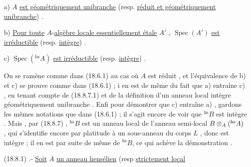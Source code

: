 a) $A$ \uline{est géométriquement unibranche} (resp. \uline{réduit et géométriquement unibranche}) .

b) \uline{Pour toute} $A$-\uline{algèbre locale essentiellement étale} $A'$ , $\operatorname{Spec}(A')$ \uline{est irréductible} (resp. \uline{intègre}) .

c) $\operatorname{Spec}({}^{\mathrm{hs}}A)$ \uline{est irréductible} (resp. \uline{intègre}) .

On se ramène comme dans (18.6.1) au cas où $A$ est réduit \handwritten{[}, \handwritten{]} et l'équivalence de b) et c) se prouve comme dans (18.6.1) ; i en est de même du fait que a) entraîne c) , en tenant compte de (18.8.7.1) et de la définition d'un anneau local intègre géométriquement unibranche . Enfi pour démontrer que c) entraîne a) , gardons les mêmes notations que dans (18.6.1) ; il s'agit encore de voir que $ {}^{\mathrm{hs}}B$ est intègre . Mais , par (18.8.7) , $ {}^{\mathrm{hs}}B$ est un anneau local de l'anneau semi-local $B\otimes_A({}^{\mathrm{hs}}A)$ , qui s'identifie encore par platitude à un sous-anneau du corps $L$ , donc est intègre ; il en est par suite de même de $ {}^{\mathrm{hs}}B$, \handwritten{\unsure{/}}ce qui achève la démonstration .

 (18.8.1) .- \uline{Soit} $A$ \uline{un anneau  hensélien} (resp \uline{strictement local}\handwritten{)}
